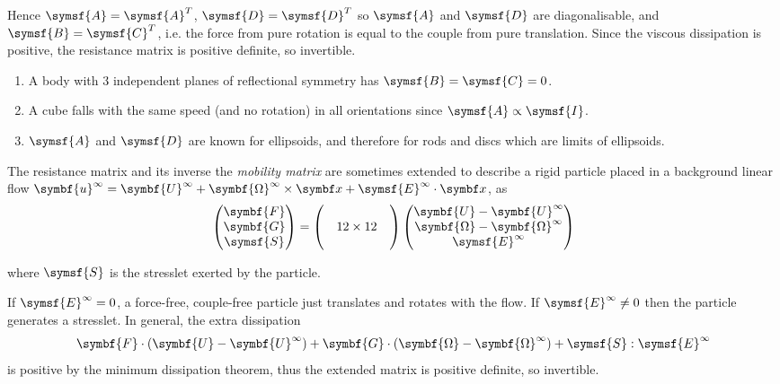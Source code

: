 \documentclass{jknotes}
\begin{document}
Hence $\symsf{A} = \symsf{A}^T$, $\symsf{D} = \symsf{D}^T$ so $\symsf{A}$
and $\symsf{D}$ are diagonalisable, and $\symsf{B} = \symsf{C}^T$, i.e. the
force from pure rotation is equal to the couple from pure translation. Since
the viscous dissipation is positive, the resistance matrix is positive
definite, so invertible.

\begin{eg}
	\hspace{2in}
	\begin{enumerate}
		\item A body with $3$ independent planes of reflectional symmetry has
			$\symsf{B} = \symsf{C} = 0$.
		\item A cube falls with the same speed (and no rotation) in all
			orientations since $\symsf{A} \propto \symsf{I}$.
		\item $\symsf{A}$ and $\symsf{D}$ are known for ellipsoids, and
			therefore for rods and discs which are limits of ellipsoids.
	\end{enumerate}
\end{eg}

The resistance matrix and its inverse the \emph{mobility matrix} are sometimes
extended to describe a rigid particle placed in a background linear flow
$\symbf{u}^\infty = \symbf{U}^\infty + \symbf{\Omega}^\infty \times \x +
\symsf{E}^\infty \cdot \x$, as 
\begin{equation}
\begin{pmatrix} \symbf{F} \\ \symbf{G} \\ \symsf{S} \end{pmatrix} = \begin{pmatrix}
&&\\&12 \times 12 & \\ &&\end{pmatrix} \begin{pmatrix} \symbf{U}-\symbf{U}^\infty \\
\symbf{\Omega} - \symbf{\Omega}^\infty \\ \symsf{E}^\infty \end{pmatrix}
\end{equation}

where $\symsf{S}$ is the stresslet exerted by the particle.


If $\symsf{E}^\infty = 0$, a force-free, couple-free particle just translates
and rotates with the flow. If $\symsf{E}^\infty \ne 0 $ then the particle
generates a stresslet. In general, the extra dissipation
\begin{equation}
	\symbf{F}\cdot(\symbf{U} - \symbf{U}^\infty) + \symbf{G} \cdot (\symbf{\Omega} -
	\symbf{\Omega}^\infty) + \symsf{S}:\symsf{E}^\infty
\end{equation}
is positive by the minimum dissipation theorem, thus the extended
matrix is positive definite, so invertible.
\end{document}
